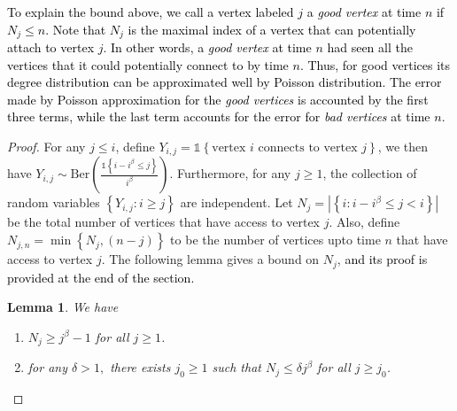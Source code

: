 \documentclass[letterpaper,11pt,reqno]{amsart}
\newenvironment{enumeratei}{\begin{enumerate}[\upshape i)]}{\end{enumerate}}
\newtheorem{lem}[thm]{Lemma}
\theoremstyle{definition}
\renewcommand{\leq}{\leqslant}
\renewcommand{\geq}{\geqslant}
\newcommand{\ind}{\mathds{1}}
\newcommand{\set}[1]{\left\{#1\right\}}
\begin{document}
\textcolor{black}{ To explain the bound above, we call a vertex labeled $j$ a \emph{good vertex} at time $n$ if $N_j \leq n$. Note that $N_j$ is the maximal index of a vertex that can potentially attach to vertex $j$.  In other words, a \emph{good vertex } at time $n$ had seen all the vertices that it could potentially connect to by time $n$. Thus, for good vertices its degree distribution can be approximated well by Poisson distribution. The error made by Poisson approximation for the \emph{good vertices} is accounted by the first three terms, while the last term accounts for the error for \emph{bad vertices}  at time $n$.}
\begin{proof}
For any $j \leq i$, define $Y_{i,j} = \ind\set{\text{vertex }i\text{ connects to  vertex }j}$, we then have $Y_{i,j}\sim \text{Ber}\left(\frac{\ind\set{i-i^\beta \leq j}}{i^\beta}\right).$ Furthermore, for any $j \geq 1$, the collection of random variables $\set{Y_{i,j}:i\geq j}$ are independent. Let $N_j = |\set{i: i-i^\beta \leq j < i}|$ be the total number of vertices that have access to vertex $j$. Also, define $N_{j,n} = \min\set{N_j,(n-j)}$ to be the number of vertices upto time $n$ that have access to vertex $j$. The following lemma gives a bound on $N_j$, \textcolor{black}{and its proof is provided at the end of the section.}
\begin{lem}\label{lem:n_j-bound}
    We have \begin{enumeratei}
        \item $N_j \geq j^\beta-1$ for all $j\geq 1$.
        \item for any $\delta > 1,$ there exists $j_0\geq 1$ such that $N_j \leq \delta j^\beta$ for all $j\geq j_0$.
    \end{enumeratei}
\end{lem}







\end{proof}
\end{document}
